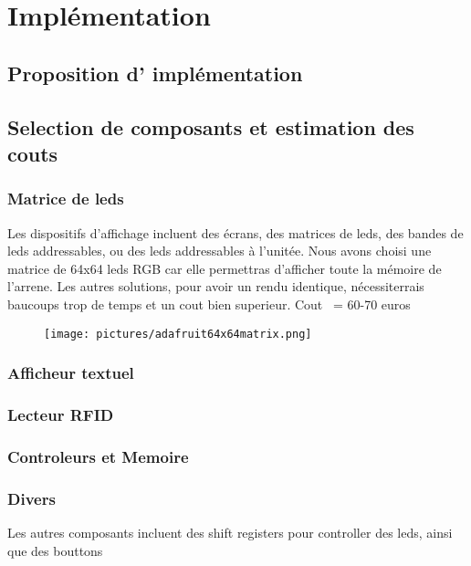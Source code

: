 \documentclass[12pt,a4paper,titlepage]{article}
\begin{document}
      \section{Implémentation}

        \subsection{Proposition d' implémentation}

        \subsection{Selection de composants et estimation des couts}

          \subsubsection{Matrice de leds}

Les dispositifs d'affichage incluent des écrans, des matrices de leds, des bandes de leds addressables, ou des leds addressables à l'unitée.  
Nous avons choisi une matrice de 64x64 leds RGB car elle permettras d'afficher toute la mémoire de l'arrene. Les autres solutions, pour avoir un rendu identique, nécessiterrais baucoups trop de temps et un cout bien superieur.
Cout ~= 60-70 euros

            \begin{figure}[h]
              \texttt{[image: pictures/adafruit64x64matrix.png]}
            \end{figure}

          \subsubsection{Afficheur textuel}



          \subsubsection{Lecteur RFID}



          \subsubsection{Controleurs et Memoire}



          \subsubsection{Divers}

Les autres composants incluent des shift registers pour controller des leds, ainsi que des bouttons
\end{document}
